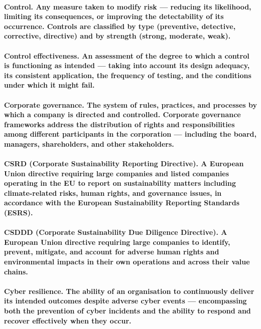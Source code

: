 \paragraph{\textbf{Control}. Any measure taken to modify risk — reducing its likelihood, limiting its consequences, or improving the detectability of its occurrence. Controls are classified by type (preventive, detective, corrective, directive) and by strength (strong, moderate, weak).}

\paragraph{\textbf{Control effectiveness}. An assessment of the degree to which a control is functioning as intended — taking into account its design adequacy, its consistent application, the frequency of testing, and the conditions under which it might fail.}

\paragraph{\textbf{Corporate governance}. The system of rules, practices, and processes by which a company is directed and controlled. Corporate governance frameworks address the distribution of rights and responsibilities among different participants in the corporation — including the board, managers, shareholders, and other stakeholders.}

\paragraph{\textbf{CSRD (Corporate Sustainability Reporting Directive)}. A European Union directive requiring large companies and listed companies operating in the EU to report on sustainability matters including climate-related risks, human rights, and governance issues, in accordance with the European Sustainability Reporting Standards (ESRS).}

\paragraph{\textbf{CSDDD (Corporate Sustainability Due Diligence Directive)}. A European Union directive requiring large companies to identify, prevent, mitigate, and account for adverse human rights and environmental impacts in their own operations and across their value chains.}

\paragraph{\textbf{Cyber resilience}. The ability of an organisation to continuously deliver its intended outcomes despite adverse cyber events — encompassing both the prevention of cyber incidents and the ability to respond and recover effectively when they occur.}

